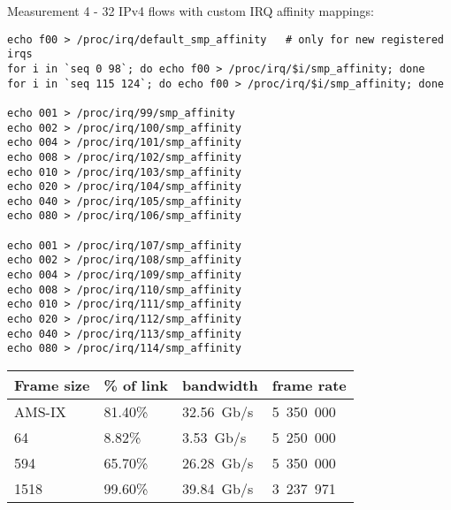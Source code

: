 



\newpage

Measurement 4 - 32 IPv4 flows with custom IRQ affinity mappings:
\begin{lstlisting}
echo f00 > /proc/irq/default_smp_affinity   # only for new registered irqs
for i in `seq 0 98`; do echo f00 > /proc/irq/$i/smp_affinity; done
for i in `seq 115 124`; do echo f00 > /proc/irq/$i/smp_affinity; done

echo 001 > /proc/irq/99/smp_affinity
echo 002 > /proc/irq/100/smp_affinity
echo 004 > /proc/irq/101/smp_affinity
echo 008 > /proc/irq/102/smp_affinity
echo 010 > /proc/irq/103/smp_affinity
echo 020 > /proc/irq/104/smp_affinity
echo 040 > /proc/irq/105/smp_affinity
echo 080 > /proc/irq/106/smp_affinity

echo 001 > /proc/irq/107/smp_affinity
echo 002 > /proc/irq/108/smp_affinity
echo 004 > /proc/irq/109/smp_affinity
echo 008 > /proc/irq/110/smp_affinity
echo 010 > /proc/irq/111/smp_affinity
echo 020 > /proc/irq/112/smp_affinity
echo 040 > /proc/irq/113/smp_affinity
echo 080 > /proc/irq/114/smp_affinity
\end{lstlisting}

\begin{tabular}{ | l | l | l | l |}
\hline
Frame size & \% of link & bandwidth & frame rate \\
\hline
AMS-IX &  81.40\% & 32.56~Gb/s & 5~350~000 \\ %
64     &   8.82\% &  3.53~Gb/s & 5~250~000 \\ %
594    &  65.70\% & 26.28~Gb/s & 5~350~000 \\ %
1518   &  99.60\% & 39.84~Gb/s & 3~237~971 \\ %
\hline
\end{tabular}


